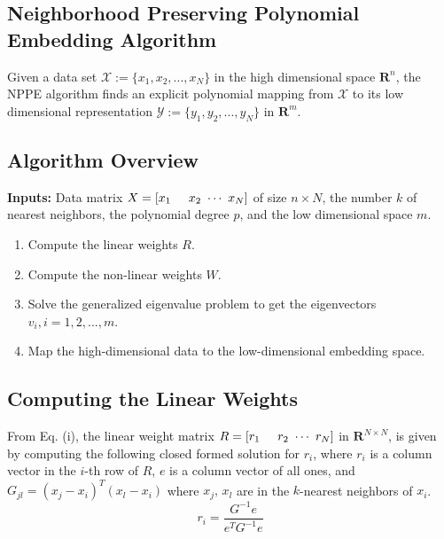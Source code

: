 \documentclass[a0,landscape]{a0poster}
\begin{document}
\begin{multicols}{4}
\vspace{0.5cm}
\begin{tcolorbox}[colback=white,colframe=black]
    \color{DarkSlateGray}
    \begin{center}\section*{Neighborhood Preserving Polynomial Embedding Algorithm}\end{center}
\end{tcolorbox}
\color{Black}
Given a data set $\mathcal{X}:=\{x_1, x_2, ..., x_N\}$ in the high dimensional space $\mathbf{R} ^n$, the NPPE algorithm finds an explicit polynomial mapping from $\mathcal{X}$ to its low dimensional representation $\mathcal{Y}:=\{y_1, y_2, ..., y_N\}$ in $\mathbf{R}^m$.
\vspace{1cm}
\subsection*{Algorithm Overview}
\textbf{Inputs:} Data matrix $X=[x_1 \hspace{0.5cm} x_2 \text{ }\cdots\text{ } x_N]$ of size $n \times N$, the number $k$ of nearest neighbors, the polynomial degree $p$, and the low dimensional space $m$. 
\begin{enumerate}
\item Compute the linear weights $R$.
\item Compute the non-linear weights $W$.
\item Solve the generalized eigenvalue problem to get the eigenvectors $v_i, i=1,2,...,m$.
\item Map the high-dimensional data to the low-dimensional embedding space.
\end{enumerate}
\subsection*{Computing the Linear Weights}
From Eq. (i), the linear weight matrix $R=\left[r_1 \hspace{0.5cm} r_2 \text{ }\cdots\text{ } r_N\right]$ in $\mathbf{R}^{N \times N}$, is given by computing the following closed formed solution for $r_i$, where $r_i$ is a column vector in the $i$-th row of $R$, $e$ is a column vector of all ones, and $G_{jl}=(x_j-x_i)^T(x_l-x_i)$ where $x_j,\,x_l$ are in the $k$-nearest neighbors of $x_i$. 
\begin{equation}
r_i = \frac{G^{-1}e}{e^TG^{-1}e}
\end{equation}

\end{multicols}
\end{document}
